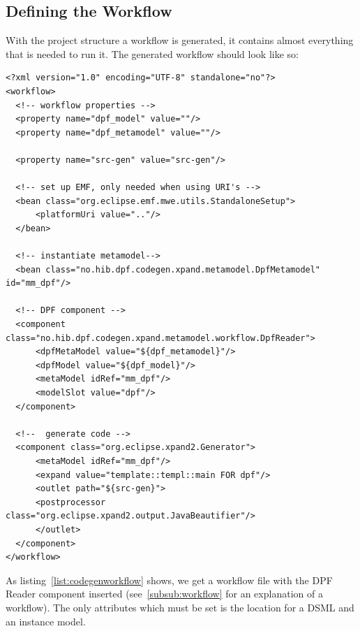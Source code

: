 \subsection{Defining the Workflow}
With the project structure a workflow is generated, it contains almost everything that is needed to run it. The generated workflow should look like so:

\lstset{language=XML,caption=The generated workflow file in a DPF Generator Project,label=list:codegenworkflow,captionpos=b}
\begin{table}[h]
  \centering  
  \begin{lstlisting}[showstringspaces=false]
<?xml version="1.0" encoding="UTF-8" standalone="no"?>
<workflow>
  <!-- workflow properties -->
  <property name="dpf_model" value=""/>
  <property name="dpf_metamodel" value=""/>

  <property name="src-gen" value="src-gen"/>

  <!-- set up EMF, only needed when using URI's -->	
  <bean class="org.eclipse.emf.mwe.utils.StandaloneSetup">
      <platformUri value=".."/>
  </bean>
	
  <!-- instantiate metamodel-->
  <bean class="no.hib.dpf.codegen.xpand.metamodel.DpfMetamodel" id="mm_dpf"/>
	
  <!-- DPF component -->
  <component class="no.hib.dpf.codegen.xpand.metamodel.workflow.DpfReader">
      <dpfMetaModel value="${dpf_metamodel}"/>
      <dpfModel value="${dpf_model}"/>
      <metaModel idRef="mm_dpf"/>
      <modelSlot value="dpf"/>
  </component>
	
  <!--  generate code -->
  <component class="org.eclipse.xpand2.Generator">
      <metaModel idRef="mm_dpf"/>
      <expand value="template::templ::main FOR dpf"/>
      <outlet path="${src-gen}">
	  <postprocessor class="org.eclipse.xpand2.output.JavaBeautifier"/>
      </outlet>
  </component>
</workflow>
  \end{lstlisting}
\end{table}

\newpage

As listing~\ref{list:codegenworkflow} shows, we get a workflow file with the DPF Reader component inserted (see~\ref{subsub:workflow} for an explanation of a workflow). The only attributes which must be set is the location for a DSML and an instance model.

